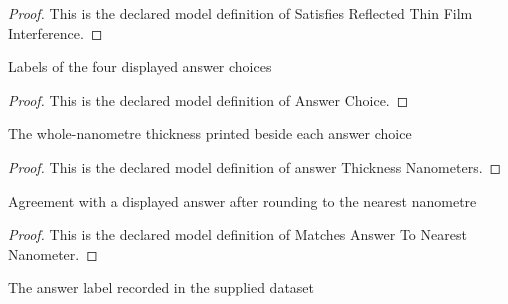 \begin{proof}
  This is the declared model definition of Satisfies Reflected Thin Film Interference.
\end{proof}
\begin{definition}
  \label{def:physics:phyx-mini-0084:phyxminiproblems-problemphyxmini0084-answerchoice}
  Labels of the four displayed answer choices
\end{definition}
\begin{proof}
  This is the declared model definition of Answer Choice.
\end{proof}
\begin{definition}
  \label{def:physics:phyx-mini-0084:phyxminiproblems-problemphyxmini0084-answerthicknessnanometers}
  The whole-nanometre thickness printed beside each answer choice
\end{definition}
\begin{proof}
  This is the declared model definition of answer Thickness Nanometers.
\end{proof}
\begin{definition}
  \label{def:physics:phyx-mini-0084:phyxminiproblems-problemphyxmini0084-matchesanswertonearestnanometer}
  Agreement with a displayed answer after rounding to the nearest nanometre
\end{definition}
\begin{proof}
  This is the declared model definition of Matches Answer To Nearest Nanometer.
\end{proof}
\begin{definition}
  \label{def:physics:phyx-mini-0084:phyxminiproblems-problemphyxmini0084-recordeddatasetanswer}
  The answer label recorded in the supplied dataset
\end{definition}
